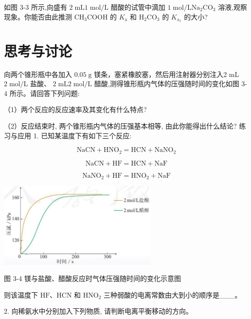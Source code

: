 \documentclass[10pt]{article}
\begin{document}
如图 3-3 所示,向盛有 \(2\mathrm{\;{mL}}1\mathrm{\;{mol}}/\mathrm{L}\) 醋酸的试管中滴加 \(1\mathrm{\;{mol}}/\mathrm{L}{\mathrm{{Na}}}_{2}{\mathrm{{CO}}}_{3}\) 溶液,观察现象。你能否由此推测 \({\mathrm{{CH}}}_{3}\mathrm{{COOH}}\) 的 \({K}_{\mathrm{a}}\) 和 \({\mathrm{H}}_{2}{\mathrm{{CO}}}_{3}\) 的 \({K}_{{\mathrm{a}}_{1}}\) 的大小?

\section*{思考与讨论}

向两个锥形瓶中各加入 \({0.05}\mathrm{\;g}\) 镁条，塞紧橡胶塞，然后用注射器分别注入2 mL \(2\mathrm{\;{mol}}/\mathrm{L}\) 盐酸、 \(2\mathrm{\;{mL}}2\mathrm{\;{mol}}/\mathrm{L}\) 醋酸,测得锥形瓶内气体的压强随时间的变化如图 3-4 所示。请回答下列问题:

（1）两个反应的反应速率及其变化有什么特点?

（2）反应结束时, 两个锥形瓶内气体的压强基本相等, 由此你能得出什么结论? 练习与应用 1. 已知某温度下有如下三个反应:

\[
\mathrm{{NaCN}} + {\mathrm{{HNO}}}_{2} = \mathrm{{HCN}} + {\mathrm{{NaNO}}}_{2}
\]

\[
\mathrm{{NaCN}} + \mathrm{{HF}} = \mathrm{{HCN}} + \mathrm{{NaF}}
\]

\[
{\mathrm{{NaNO}}}_{2} + \mathrm{{HF}} = {\mathrm{{HNO}}}_{2} + \mathrm{{NaF}}
\]

\begin{center}
\includegraphics[max width=0.6\textwidth]{images/0190da9d-8bfd-732f-bc2c-0b21d0f13b91_66_551868.jpg}
\end{center}

图 3-4 镁与盐酸、醋酸反应时气体压强随时间的变化示意图

则该温度下 \(\mathrm{{HF}}\text{、}\mathrm{{HCN}}\) 和 \({\mathrm{{HNO}}}_{2}\) 三种弱酸的电离常数由大到小的顺序是\_\_\_。

2. 向稀氨水中分别加入下列物质, 请判断电离平衡移动的方向。

\begin{center}
\end{center}
\end{document}
